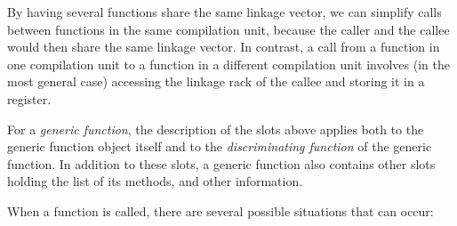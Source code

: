 By having several functions share the same linkage vector, we can
simplify calls between functions in the same compilation unit, because
the caller and the callee would then share the same linkage vector.
In contrast, a call from a function in one compilation unit to a
function in a different compilation unit involves (in the most general
case) accessing the linkage rack of the callee and storing it in a
register.

For a \emph{generic function}, the description of the slots above
applies both to the generic function object itself and to the
\emph{discriminating function} of the generic function.  In addition
to these slots, a generic function also contains other slots holding
the list of its methods, and other information.

When a function is called, there are several possible situations that
can occur:


